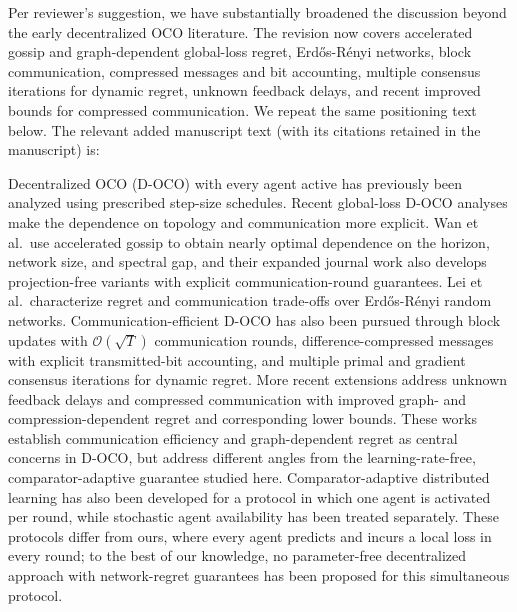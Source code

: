 \documentclass[12pt,english]{reviewresponse}
\begin{document}
\begin{revresponse}
    Per reviewer's suggestion, we have  substantially broadened the discussion beyond the early decentralized OCO literature.  The revision now covers accelerated gossip and graph-dependent global-loss regret, Erd\H{o}s-R\'enyi networks, block communication, compressed messages and bit accounting, multiple consensus iterations for dynamic regret, unknown feedback delays, and recent improved bounds for compressed communication.  We repeat the same positioning text below.
    The relevant added manuscript text (with its citations retained in the manuscript) is:
    \begin{changes}
        Decentralized OCO (D-OCO) with every agent active has previously been analyzed using prescribed step-size schedules.
        Recent global-loss D-OCO analyses make the dependence on topology and communication more explicit.
        Wan et al.\ use accelerated gossip to obtain nearly optimal dependence on the horizon, network size, and spectral gap, and their expanded journal work also develops projection-free variants with explicit communication-round guarantees.
        Lei et al.\ characterize regret and communication trade-offs over Erd\H{o}s-R\'enyi random networks.
        Communication-efficient D-OCO has also been pursued through block updates with $\mathcal{O}(\sqrt{T})$ communication rounds, difference-compressed messages with explicit transmitted-bit accounting, and multiple primal and gradient consensus iterations for dynamic regret.
        More recent extensions address unknown feedback delays and compressed communication with improved graph- and compression-dependent regret and corresponding lower bounds.
        These works establish communication efficiency and graph-dependent regret as central concerns in D-OCO, but address different angles from the learning-rate-free, comparator-adaptive guarantee studied here.
        Comparator-adaptive distributed learning has also been developed for a protocol in which one agent is activated per round, while stochastic agent availability has been treated separately.
        These protocols differ from ours, where every agent predicts and incurs a local loss in every round; to the best of our knowledge, no parameter-free decentralized approach with network-regret guarantees has been proposed for this simultaneous protocol.


\end{changes}
\end{revresponse}
\end{document}
